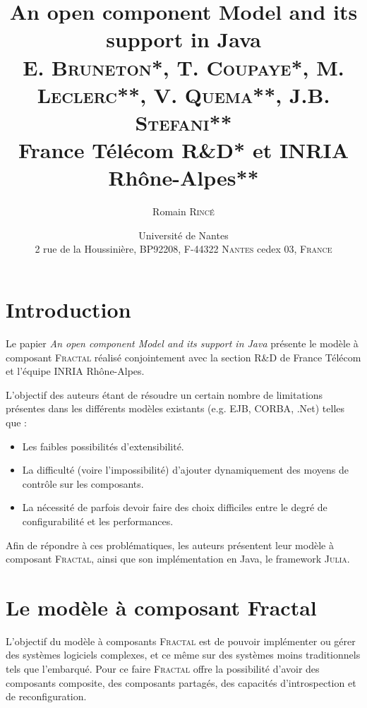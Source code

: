 \documentclass[12pt,a4paper,utf8x]{report}
\title{An open component Model and its support in Java\\\vspace{0.5cm}
\small E. \textsc{Bruneton}*, T. \textsc{Coupaye}*, M. \textsc{Leclerc}**, V. \textsc{Quema}**, J.B. \textsc{Stefani}**\\\vspace{0.5cm}
France Télécom R\&D* et \textsc{INRIA} Rhône-Alpes**}
\author{Romain \textsc{Rincé}}
\date{Université de Nantes \\ 2 rue de la Houssinière, BP92208, F-44322 \textsc{Nantes} cedex 03, \textsc{France}}
\newcommand{\versalitas}[1]{{\usefont{T1}{cmr}{bx}{sc}#1}}%
\newcommand\fractal{\textsc{Fractal}}
\newcommand\julia{\textsc{Julia}}
\begin{document}
\maketitle
\renewcommand{\labelitemi}{$\bullet$} 

\clearpage

\clearpage

\section{Introduction}
Le papier \og \emph{An open component Model and its support in Java}\fg{} présente le modèle à composant \fractal{} réalisé conjointement avec la section R\&D de France Télécom et l'équipe \textsc{INRIA} Rhône-Alpes. 

L'objectif des auteurs étant de résoudre un certain nombre de limitations présentes dans les différents modèles existants (e.g. \textsc{EJB}, \textsc{CORBA}, .Net) telles que :
\begin{itemize}
 \item Les faibles possibilités d'extensibilité.
 \item La difficulté (voire l'impossibilité) d'ajouter dynamiquement des moyens de contrôle sur les composants.
 \item La nécessité de parfois devoir faire des choix difficiles entre le degré de configurabilité et les performances. 
\end{itemize}
Afin de répondre à ces problématiques, les auteurs présentent leur modèle à composant \fractal, ainsi que son implémentation en Java, le framework \julia.




\section{Le modèle à composant \versalitas{Fractal}}
L'objectif du modèle à composants \fractal{} est de pouvoir implémenter ou gérer des systèmes logiciels complexes, et ce même sur des systèmes moins traditionnels tels que l'embarqué. Pour ce faire \fractal{} offre la possibilité d'avoir des composants composite, des composants partagés,  des capacités d'introspection et de reconfiguration.
\end{document}
